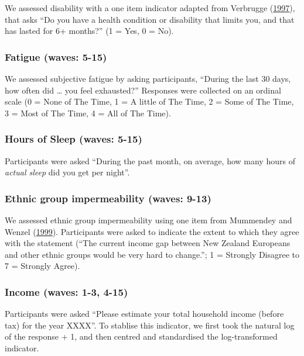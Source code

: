 \documentclass[
  singlecolumn]{report}
\begin{document}
We assessed disability with a one item indicator adapted from Verbrugge
(\protect\hyperlink{ref-verbrugge1997}{1997}), that asks ``Do you have a
health condition or disability that limits you, and that has lasted for
6+ months?'' (1 = Yes, 0 = No).

\hypertarget{fatigue-waves-5-15}{%
\subsubsection{Fatigue (waves: 5-15)}\label{fatigue-waves-5-15}}

We assessed subjective fatigue by asking participants, ``During the last
30 days, how often did \ldots{} you feel exhausted?'' Responses were
collected on an ordinal scale (0 = None of The Time, 1 = A little of The
Time, 2 = Some of The Time, 3 = Most of The Time, 4 = All of The Time).

\hypertarget{hours-of-sleep-waves-5-15}{%
\subsubsection{Hours of Sleep (waves:
5-15)}\label{hours-of-sleep-waves-5-15}}

Participants were asked ``During the past month, on average, how many
hours of \emph{actual sleep} did you get per night''.

\hypertarget{ethnic-group-impermeability-waves-9-13}{%
\subsubsection{Ethnic group impermeability (waves:
9-13)}\label{ethnic-group-impermeability-waves-9-13}}

We assessed ethnic group impermeability using one item from Mummendey
and Wenzel (\protect\hyperlink{ref-mummendey_social_1999}{1999}).
Participants were asked to indicate the extent to which they agree with
the statement (``The current income gap between New Zealand Europeans
and other ethnic groups would be very hard to change.''; 1 = Strongly
Disagree to 7 = Strongly Agree).

\hypertarget{income-waves-1-3-4-15}{%
\subsubsection{Income (waves: 1-3, 4-15)}\label{income-waves-1-3-4-15}}

Participants were asked ``Please estimate your total household income
(before tax) for the year XXXX''. To stablise this indicator, we first
took the natural log of the response + 1, and then centred and
standardised the log-transformed indicator.
\end{document}
